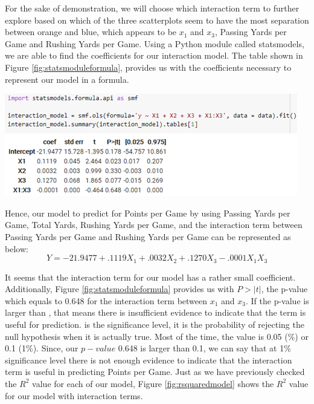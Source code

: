 \documentclass[a4paper,12pt]{report}
\begin{document}
For the sake of demonstration, we will choose which interaction term to further explore based on which of the three scatterplots seem to have the most separation between orange and blue, which appears to be $x_1$ and $x_3$, Passing Yards per Game and Rushing Yards per Game. Using a Python module called statsmodels, we are able to find the coefficients for our interaction model. The table shown in Figure \ref{fig:statsmoduleformula}, provides us with the coefficients necessary to represent our model in a formula.

\begin{center}
    \captionsetup{type=figure}
    \includegraphics[width=.9\linewidth]{media/statsmoduleformula.png}
    \label{fig:statsmoduleformula}
\end{center}

Hence, our model to predict for Points per Game by using Passing Yards per Game, Total Yards, Rushing Yards per Game, and the interaction term between Passing Yards per Game and Rushing Yards per Game can be represented as below:
$$Y=-21.9477+.1119X_1+.0032X_2+.1270X_3-.0001X_1X_3$$

It seems that the interaction term for our model has a rather small coefficient. Additionally, Figure \ref{fig:statsmoduleformula} provides us with $P>|t|$, the p-value which equals to 0.648 for the interaction term between $x_1$ and $x_3$. If the p-value is larger than , that means there is insufficient evidence to indicate that the term is useful for prediction.  is the significance level, it is the probability of rejecting the null hypothesis when it is actually true. Most of the time, the  value is 0.05 (\%) or 0.1 (1\%). Since, our $p-value$ 0.648 is larger than 0.1, we can say that at 1\% significance level there is not enough evidence to indicate that the interaction term is useful in predicting Points per Game. Just as we have previously checked the $R^2$  value for each of our model, Figure \ref{fig:rsquaredmodel} shows the $R^2$ value for our model with interaction terms.
\end{document}
